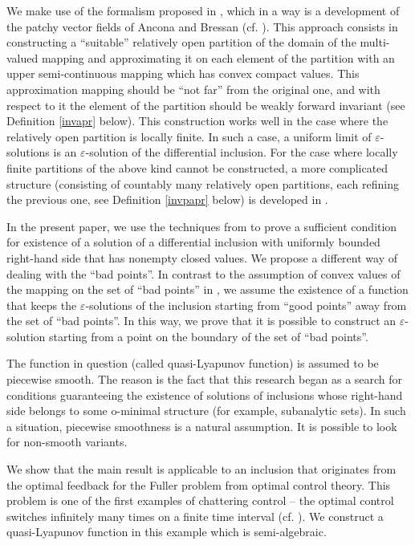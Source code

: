 \documentclass[a4paper]{article}
\begin{document}
We make use of the formalism proposed in \cite{KR}, which in a way is a development of the patchy vector fields of Ancona and Bressan (cf. \cite{AB}). This approach consists in constructing a ``suitable'' relatively open partition of the domain of the multi-valued mapping and approximating it on each element of the partition with an upper semi-continuous mapping which has convex compact values. This approximation mapping should be ``not far'' from the original one, and with respect to it the element of the partition should be weakly forward invariant (see Definition \ref{invapr} below). This construction works well in the case where the relatively open partition is locally finite. In such a case, a uniform limit of $\varepsilon$-solutions is an $\varepsilon$-solution of the differential inclusion. For the case where locally finite partitions of the above kind cannot be constructed, a more complicated structure (consisting of countably many relatively open partitions, each refining the previous one, see Definition \ref{invpapr} below) is developed in \cite{KR}.

In the present paper, we use the techniques from \cite{KR} to prove a sufficient condition for existence of a solution of a differential inclusion with uniformly bounded right-hand side that has nonempty closed values. We propose a different way of dealing with the ``bad points''. In contrast to the assumption of convex values of the mapping on the set of ``bad points'' in \cite{KR}, we assume the existence of a function that keeps the $\varepsilon$-solutions of the inclusion starting from ``good points'' away from the set of ``bad points''. In this way, we prove that it is possible to construct an $\varepsilon$-solution starting from a point on the boundary of the set of ``bad points''.

The function in question (called quasi-Lyapunov function) is assumed to be piecewise smooth. The reason is the fact that this research began as a search for conditions guaranteeing the existence of solutions of inclusions whose right-hand side belongs to some o-minimal structure (for example, subanalytic sets). In such a situation, piecewise smoothness is a natural assumption. It is possible to look for non-smooth variants.

We show that the main result is applicable to an inclusion that originates from the optimal feedback for the Fuller problem from optimal control theory. This problem is one of the first examples of chattering control -- the optimal control switches infinitely many times on a finite time interval (cf. \cite{ZB}). We construct a quasi-Lyapunov function in this example which is semi-algebraic.
\end{document}
